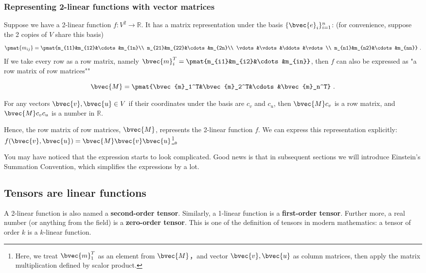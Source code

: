 \subsubsection{Representing 2-linear functions with vector matrices}

Suppose we have a 2-linear function $f:V^2\rightarrow\mathbb{R}$. It has a matrix representation under the basis $\{\bvec{e}_i\}_{i=1}^n$: (for convenience, suppose the 2 copies of $V$ share this basis)
\begin{equation}
\pmat{m_{ij}}=\pmat{m_{11}&m_{12}&\cdots&m_{1n}\\ m_{21}&m_{22}&\cdots&m_{2n}\\ \vdots&\vdots&\ddots&\vdots\\ m_{n1}&m_{n2}&\cdots&m_{nn}}~.
\end{equation}
If we take every row as a row matrix, namely $\bvec{m}_i^T=\pmat{m_{i1}&m_{i2}&\cdots&m_{in}}$, then $f$ can also be expressed as "a row matrix of row matrices"" 

\begin{equation}
\bvec{M}=\pmat{\bvec{m}_1^T&\bvec{m}_2^T&\cdots&\bvec{m}_n^T}~.
\end{equation}

For any vectors $\bvec{v}, \bvec{u}\in V$ if their coordinates under the basis are $c_v$ and $c_u$, then $\bvec{M}c_v$ is a row matrix, and $\bvec{M}c_vc_u$ is a number in $\mathbb{R}$. 

Hence, the row matrix of row matrices, $\bvec{M}$, represents the 2-linear function $f$. We can express this representation explicitly: $f(\bvec{v}, \bvec{u})=\bvec{M}\bvec{v}\bvec{u}$\footnote{Here, we treat $\bvec{m}_1^T$ as an element from $\bvec{M}$，and vector $\bvec{v}, \bvec{u}$ as column matrices, then apply the matrix multiplication defined by scalor product. }。

You may have noticed that the expression starts to look complicated. Good news is that in subsequent sections we will introduce Einstein's Summation Convention, which simplifies the expressions by a lot. 

\subsection{Tensors are linear functions}

A 2-linear function is also named a \textbf{second-order tensor}. Similarly, a 1-linear function is a \textbf{first-order tensor}. Further more, a real number (or anything from the field) is a \textbf{zero-order tensor}. This is one of the definition of tensors in modern mathematics: a tensor of order $k$ is a $k$-linear function. 

